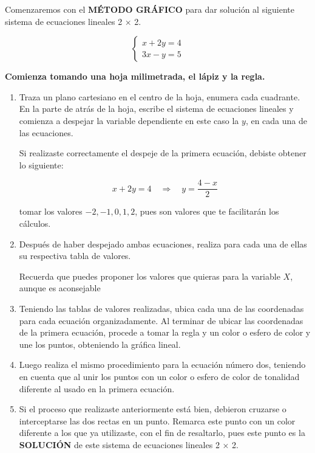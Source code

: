 \documentclass[12pt,a4paper]{article}
\begin{document}
Comenzaremos con el \textbf{MÉTODO GRÁFICO} para dar solución al siguiente sistema de ecuaciones lineales 2 × 2.

\[ \begin{cases}
x + 2y = 4 \\
3x - y = 5
\end{cases} \]

\textbf{Comienza tomando una hoja milimetrada, el lápiz y la regla.}

\begin{enumerate}[label=\alph*.]
    \item Traza un plano cartesiano en el centro de la hoja, enumera cada cuadrante. En la parte de atrás de la hoja, escribe el sistema de ecuaciones lineales y comienza a despejar la variable dependiente en este caso la $y$, en cada una de las ecuaciones.

    Si realizaste correctamente el despeje de la primera ecuación, debiste obtener lo siguiente:

    \[ x + 2y = 4 \quad \Rightarrow \quad y = \frac{4 - x}{2} \]

    tomar los valores $-2, -1, 0, 1, 2$, pues son valores que te facilitarán los cálculos.

    \item Después de haber despejado ambas ecuaciones, realiza para cada una de ellas su respectiva tabla de valores.

    Recuerda que puedes proponer los valores que quieras para la variable $X$, aunque es aconsejable

    \item Teniendo las tablas de valores realizadas, ubica cada una de las coordenadas para cada ecuación organizadamente. Al terminar de ubicar las coordenadas de la primera ecuación, procede a tomar la regla y un color o esfero de color y une los puntos, obteniendo la gráfica lineal.

    \item Luego realiza el mismo procedimiento para la ecuación número dos, teniendo en cuenta que al unir los puntos con un color o esfero de color de tonalidad diferente al usado en la primera ecuación.

    \item Si el proceso que realizaste anteriormente está bien, debieron cruzarse o interceptarse las dos rectas en un punto. Remarca este punto con un color diferente a los que ya utilizaste, con el fin de resaltarlo, pues este punto es la \textbf{SOLUCIÓN} de este sistema de ecuaciones lineales 2 × 2.
\end{enumerate}
\end{document}
